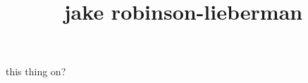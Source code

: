\documentclass[11pt, oneside]{article}
\title{jake robinson-lieberman}
\begin{document}
\maketitle

this thing on?
\end{document}
